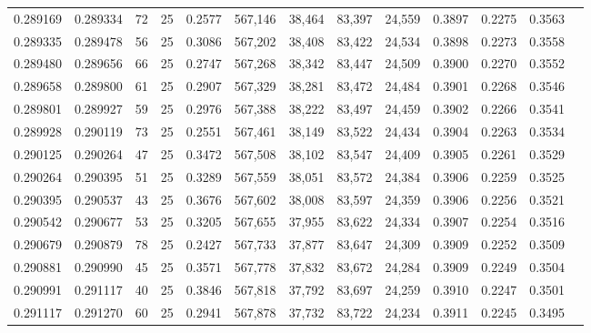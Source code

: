 \begin{tabular}{rrrrrrrrrrrrr}
0.289169 & 0.289334 &    72 &  25 &                                     0.2577 & 567,146 &  38,464 &  83,397 &  24,559 & 0.3897 & 0.2275 & 0.3563 \\
0.289335 & 0.289478 &    56 &  25 &                                     0.3086 & 567,202 &  38,408 &  83,422 &  24,534 & 0.3898 & 0.2273 & 0.3558 \\
0.289480 & 0.289656 &    66 &  25 &                                     0.2747 & 567,268 &  38,342 &  83,447 &  24,509 & 0.3900 & 0.2270 & 0.3552 \\
0.289658 & 0.289800 &    61 &  25 &                                     0.2907 & 567,329 &  38,281 &  83,472 &  24,484 & 0.3901 & 0.2268 & 0.3546 \\
0.289801 & 0.289927 &    59 &  25 &                                     0.2976 & 567,388 &  38,222 &  83,497 &  24,459 & 0.3902 & 0.2266 & 0.3541 \\
0.289928 & 0.290119 &    73 &  25 &                                     0.2551 & 567,461 &  38,149 &  83,522 &  24,434 & 0.3904 & 0.2263 & 0.3534 \\
0.290125 & 0.290264 &    47 &  25 &                                     0.3472 & 567,508 &  38,102 &  83,547 &  24,409 & 0.3905 & 0.2261 & 0.3529 \\
0.290264 & 0.290395 &    51 &  25 &                                     0.3289 & 567,559 &  38,051 &  83,572 &  24,384 & 0.3906 & 0.2259 & 0.3525 \\
0.290395 & 0.290537 &    43 &  25 &                                     0.3676 & 567,602 &  38,008 &  83,597 &  24,359 & 0.3906 & 0.2256 & 0.3521 \\
0.290542 & 0.290677 &    53 &  25 &                                     0.3205 & 567,655 &  37,955 &  83,622 &  24,334 & 0.3907 & 0.2254 & 0.3516 \\
0.290679 & 0.290879 &    78 &  25 &                                     0.2427 & 567,733 &  37,877 &  83,647 &  24,309 & 0.3909 & 0.2252 & 0.3509 \\
0.290881 & 0.290990 &    45 &  25 &                                     0.3571 & 567,778 &  37,832 &  83,672 &  24,284 & 0.3909 & 0.2249 & 0.3504 \\
0.290991 & 0.291117 &    40 &  25 &                                     0.3846 & 567,818 &  37,792 &  83,697 &  24,259 & 0.3910 & 0.2247 & 0.3501 \\
0.291117 & 0.291270 &    60 &  25 &                                     0.2941 & 567,878 &  37,732 &  83,722 &  24,234 & 0.3911 & 0.2245 & 0.3495 \\

\end{tabular}
